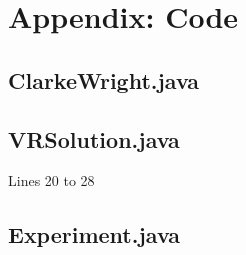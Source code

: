 \documentclass[conference]{acmsiggraph}
\begin{document}
\section{Appendix: Code}
\subsection{ClarkeWright.java}


\vfill

\subsection{VRSolution.java}
Lines 20 to 28


\subsection{Experiment.java}

\end{document}

